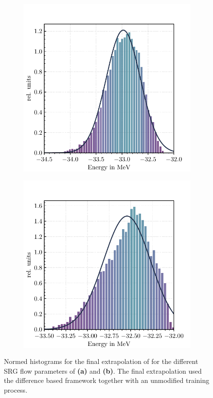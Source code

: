 \begin{figure}[H]
  \begin{subfigure}{.5\textwidth}
    \includegraphics[width=\textwidth]{media/li6_0400_histogram.pdf}
    \caption{}
  \end{subfigure}
  \begin{subfigure}{.5\textwidth}
    \includegraphics[width=\textwidth]{media/li6_0800_histogram.pdf}
    \caption{}
  \end{subfigure}
  \caption{Normed histograms for the final extrapolation of  for the different SRG flow parameters of  \textbf{(a)} and  \textbf{(b)}. The final extrapolation used the difference based framework together with an unmodified training process.}
  \label{fig:hists_li6}
\end{figure}
